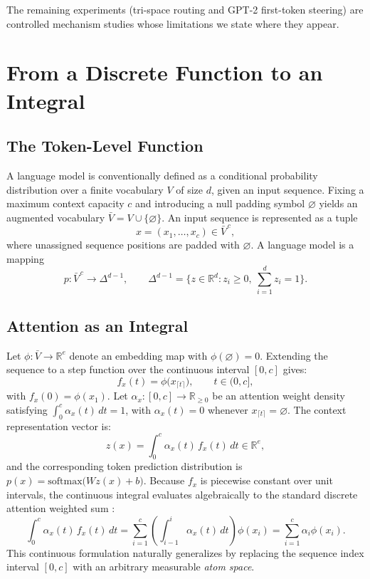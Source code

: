 \documentclass[preprint,12pt]{elsarticle}
\newcommand{\R}{\mathbb{R}}
\newcommand{\V}{V}
\newcommand{\VBar}{\bar{V}}
\begin{document}
The remaining experiments (tri-space routing and GPT-2 first-token steering) are controlled mechanism studies whose limitations we state where they appear.

\section{From a Discrete Function to an Integral}
\label{sec:discrete_to_integral}

\subsection{The Token-Level Function}

A language model is conventionally defined as a conditional probability distribution over a finite vocabulary $\V$ of size $d$, given an input sequence. Fixing a maximum context capacity $c$ and introducing a null padding symbol $\varnothing$ yields an augmented vocabulary $\VBar = \V \cup \{\varnothing\}$. An input sequence is represented as a tuple
\[
  x = (x_1, \dots, x_c) \in \VBar^{\,c},
\]
where unassigned sequence positions are padded with $\varnothing$. A language model is a mapping
\[
  p : \VBar^{\,c} \to \Delta^{d-1}, \qquad
  \Delta^{d-1} = \Big\{ z \in \R^d : z_i \ge 0,\ \sum_{i=1}^d z_i = 1 \Big\}.
\]

\subsection{Attention as an Integral}

Let $\phi : \VBar \to \R^{e}$ denote an embedding map with $\phi(\varnothing) = 0$. Extending the sequence to a step function over the continuous interval $[0,c]$ gives:
\[
  f_x(t) = \phi\big(x_{\lceil t \rceil}\big), \qquad t \in (0,c],
\]
with $f_x(0) = \phi(x_1)$. Let $\alpha_x : [0,c] \to \R_{\ge 0}$ be an attention weight density satisfying $\int_0^c \alpha_x(t)\,dt = 1$, with $\alpha_x(t) = 0$ whenever $x_{\lceil t \rceil} = \varnothing$. The context representation vector is:
\[
  z(x) = \int_0^c \alpha_x(t)\, f_x(t)\, dt \in \R^e,
\]
and the corresponding token prediction distribution is $p(x) = \mathrm{softmax}\big( W z(x) + b \big)$.
Because $f_x$ is piecewise constant over unit intervals, the continuous integral evaluates algebraically to the standard discrete attention weighted sum \cite{vaswani2017attention, martins2020sparse}:
\[
  \int_0^c \alpha_x(t)\, f_x(t)\, dt = \sum_{i=1}^c \left( \int_{i-1}^i \alpha_x(t)\, dt \right) \phi(x_i) = \sum_{i=1}^c \alpha_i \phi(x_i).
\]
This continuous formulation naturally generalizes by replacing the sequence index interval $[0,c]$ with an arbitrary measurable \emph{atom space}.
\end{document}

